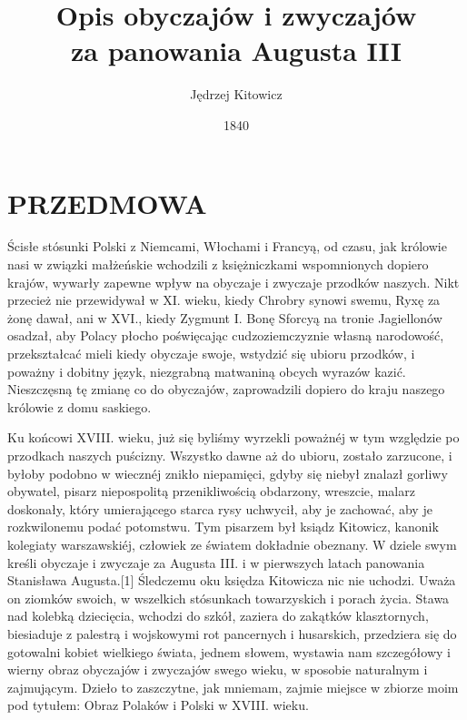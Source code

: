 \documentclass{book}
\begin{document}
\title{%
  \LARGE Opis obyczajów i zwyczajów \\
  \large za panowania Augusta III
  } 
\author{\Large Jędrzej Kitowicz}
\date{1840}

\maketitle

\pagebreak

\tableofcontents

\chapter*{PRZEDMOWA}
Ścisłe stósunki Polski z Niemcami, Włochami i Francyą, od czasu, jak królowie nasi w związki małżeńskie wchodzili z księżniczkami wspomnionych dopiero krajów, wywarły zapewne wpływ na obyczaje i zwyczaje przodków naszych. Nikt przecież nie przewidywał w XI. wieku, kiedy Chrobry synowi swemu, Ryxę za żonę dawał, ani w XVI., kiedy Zygmunt I. Bonę Sforcyą na tronie Jagiellonów osadzał, aby Polacy płocho poświęcając cudzoziemczyznie własną narodowość, przekształcać mieli kiedy obyczaje swoje, wstydzić się ubioru przodków, i poważny i dobitny język, niezgrabną matwaniną obcych wyrazów kazić. Nieszczęsną tę zmianę co do obyczajów, zaprowadzili dopiero do kraju naszego królowie z domu saskiego.

Ku końcowi XVIII. wieku, już się byliśmy wyrzekli poważnéj w tym względzie po przodkach naszych puścizny. Wszystko dawne aż do ubioru, zostało zarzucone, i byłoby podobno w wiecznéj znikło niepamięci, gdyby się niebył znalazł gorliwy obywatel, pisarz niepospolitą przenikliwością obdarzony, wreszcie, malarz doskonały, który umierającego starca rysy uchwycił, aby je zachować, aby je rozkwilonemu podać potomstwu. Tym pisarzem był ksiądz Kitowicz, kanonik kolegiaty warszawskiéj, człowiek ze światem dokładnie obeznany. W dziele swym kreśli obyczaje i zwyczaje za Augusta III. i w pierwszych latach panowania Stanisława Augusta.[1] Śledczemu oku księdza Kitowicza nic nie uchodzi. Uważa on ziomków swoich, w wszelkich stósunkach towarzyskich i porach życia. Stawa nad kolebką dziecięcia, wchodzi do szkół, zaziera do zakątków klasztornych, biesiaduje z palestrą i wojskowymi rot pancernych i husarskich, przedziera się do gotowalni kobiet wielkiego świata, jednem słowem, wystawia nam szczegółowy i wierny obraz obyczajów i zwyczajów swego wieku, w sposobie naturalnym i zajmującym. Dzieło to zaszczytne, jak mniemam, zajmie miejsce w zbiorze moim pod tytułem: Obraz Polaków i Polski w XVIII. wieku.
\end{document}
